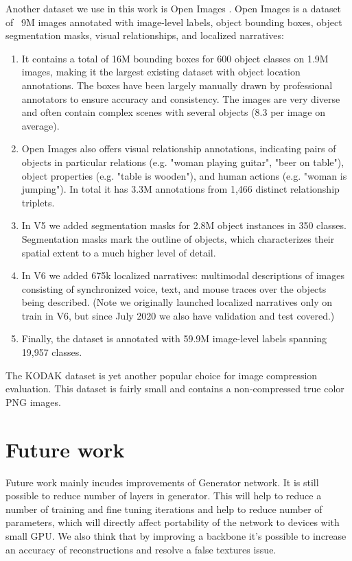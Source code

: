 Another dataset we use in this work is Open Images \cite{OpenImages2}. Open Images is a dataset of ~9M images annotated with image-level labels, object bounding boxes, object segmentation masks, visual relationships, and localized narratives:

\begin{enumerate}
    \item It contains a total of 16M bounding boxes for 600 object classes on 1.9M images, making it the largest existing dataset with object location annotations. The boxes have been largely manually drawn by professional annotators to ensure accuracy and consistency. The images are very diverse and often contain complex scenes with several objects (8.3 per image on average).
    \item Open Images also offers visual relationship annotations, indicating pairs of objects in particular relations (e.g. "woman playing guitar", "beer on table"), object properties (e.g. "table is wooden"), and human actions (e.g. "woman is jumping"). In total it has 3.3M annotations from 1,466 distinct relationship triplets.
    \item In V5 we added segmentation masks for 2.8M object instances in 350 classes. Segmentation masks mark the outline of objects, which characterizes their spatial extent to a much higher level of detail.
    \item In V6 we added 675k localized narratives: multimodal descriptions of images consisting of synchronized voice, text, and mouse traces over the objects being described. (Note we originally launched localized narratives only on train in V6, but since July 2020 we also have validation and test covered.)
    \item Finally, the dataset is annotated with 59.9M image-level labels spanning 19,957 classes.
\end{enumerate}

The KODAK \cite{kodak} dataset is yet another popular choice for image compression evaluation. This dataset is fairly small and contains a non-compressed true color PNG images.

\chapter{Future work}

Future work mainly incudes improvements of Generator network. It is still possible to reduce number of layers in generator. This will help to reduce a number of training and fine tuning iterations and help to reduce number of parameters, which will directly affect portability of the network to devices with small GPU. We also think that by improving a backbone it's possible to increase an accuracy of reconstructions and resolve a false textures issue.


